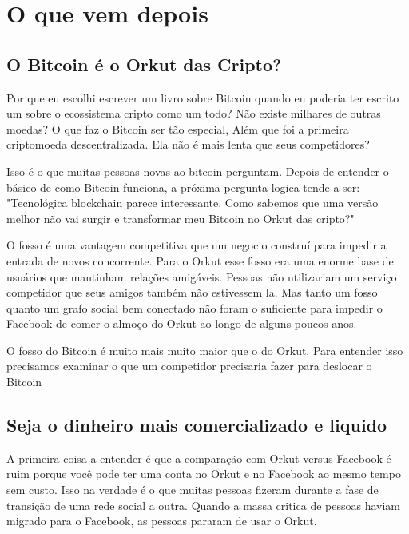 \chapter{O que vem depois}
\label{ch:capitulo9}
\section*{O Bitcoin é o Orkut das Cripto?}
Por que eu escolhi escrever um livro sobre Bitcoin quando eu poderia ter escrito um sobre o ecossistema cripto como um todo?
Não existe milhares de outras moedas? O que faz o Bitcoin ser tão especial, Além que foi a primeira criptomoeda descentralizada.
Ela não é mais lenta que seus competidores?

Isso é o que muitas pessoas novas ao bitcoin perguntam. 
Depois de entender o básico de como Bitcoin funciona, a próxima pergunta logica tende a ser: "Tecnológica blockchain parece interessante. Como sabemos que uma versão melhor não vai surgir e transformar meu Bitcoin no Orkut das cripto?"

O fosso é uma vantagem competitiva que um negocio construí para impedir a entrada de novos concorrente.
Para o Orkut esse fosso era uma enorme base de usuários que mantinham relações amigáveis. 
Pessoas não utilizariam um serviço competidor que seus amigos também não estivessem la.
Mas tanto um fosso quanto um grafo social bem conectado não foram o suficiente para impedir o Facebook de comer o almoço do Orkut ao longo de alguns poucos anos.

O fosso do Bitcoin é muito mais muito maior que o do Orkut. Para entender isso precisamos examinar o que um competidor precisaria fazer para deslocar o Bitcoin

\section*{Seja o dinheiro mais comercializado e liquido}

A primeira coisa a entender é que a comparação com Orkut versus Facebook é ruim porque você pode ter uma conta no Orkut e no Facebook ao mesmo tempo sem custo. 
Isso na verdade é o que muitas pessoas fizeram durante a fase de transição de uma rede social a outra.
Quando a massa critica de pessoas haviam migrado para o Facebook, as pessoas pararam de usar o Orkut.

